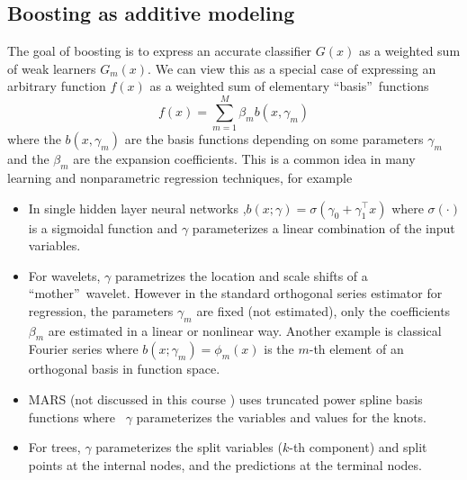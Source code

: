 \documentclass[11pt,twoside]{article}%
\theoremstyle{change}
\begin{document}
\subsection{Boosting as additive modeling}

The goal of boosting is to express an accurate classifier $G(x)$ as a weighted
sum of weak learners $G_{m}(x)$. We can view this as a special case of
expressing an arbitrary function $f(x)$ as a weighted sum of elementary
\textquotedblleft basis\textquotedblright\ functions
\[
f(x)=\sum_{m=1}^{M}\beta_{m}b(x,\gamma_{m})
\]
where the $b(x,\gamma_{m})$ are the basis functions depending on some
parameters $\gamma_{m}$ and the $\beta_{m}$ are the expansion coefficients.
This is a common idea in many learning and nonparametric regression
techniques, for example

\begin{itemize}
\item In single hidden layer neural networks ,$b(x;\gamma)=\sigma\left(
\gamma_{0}+\gamma_{1}^{\top}x\right)  $ where $\sigma(\cdot)$ is a sigmoidal
function and $\gamma$ parameterizes a linear combination of the input variables.

\item For wavelets, $\gamma$ parametrizes the location and scale shifts of a
\textquotedblleft mother\textquotedblright\ wavelet. However in the standard
orthogonal series estimator for regression, the parameters $\gamma_{m}$ are
fixed (not estimated), only the coefficients $\beta_{m}$ are estimated in a
linear or nonlinear way. Another example is classical Fourier series where
$b(x;\gamma_{m})=\phi_{m}(x)$ is the $m$-th element of an orthogonal basis in
function space.

\item MARS (not discussed in this course ) uses truncated power spline basis
functions where \ $\gamma$ parameterizes the variables and values for the knots.

\item For trees, $\gamma$ parameterizes the split variables ($k$-th component)
and split points at the internal nodes, and the predictions at the terminal nodes.
\end{itemize}
\end{document}
